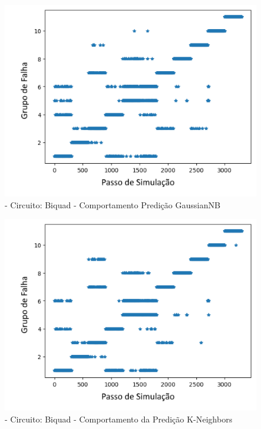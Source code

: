         \begin{figure}[H]
        \begin{center}
        \includegraphics[width=13cm]{./01_Pre_textuais/biquad_figs/GaussianNB_Biquad_Highpass_Filter_mc_+_4bitPRBS_[FALHA]raw.png}
        \caption{\label{fig:DecisionTreeClassifieSalenkey}- Circuito: Biquad - Comportamento Predição GaussianNB}
        \end{center}
        \end{figure}
        
        
        \begin{figure}[H]
        \begin{center}
        \includegraphics[width=13cm]{./01_Pre_textuais/biquad_figs/KNeighborsClassifier_Biquad_Highpass_Filter_mc_+_4bitPRBS_[FALHA]raw.png}
        \caption{\label{fig:DecisionTreeClassifieSalenkey}- Circuito: Biquad - Comportamento da Predição K-Neighbors }
        \end{center}
        \end{figure}
        
